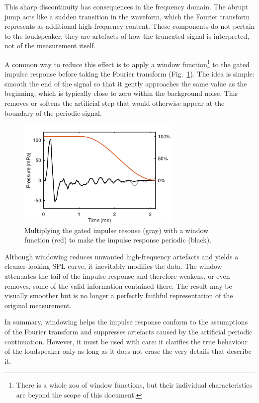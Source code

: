 \documentclass[12pt,a4paper]{article}
\providecommand{\figlabel}[1]{\label{fig:#1}}
\providecommand{\figr}[1]{Fig.~\ref{fig:#1}}
\begin{document}
This sharp discontinuity has consequences in the frequency domain. The abrupt jump acts like a sudden transition in the waveform, which the Fourier transform represents as additional high-frequency content. These components do not pertain to the loudspeaker; they are artefacts of how the truncated signal is interpreted, not of the measurement itself.

A common way to reduce this effect is to apply a window function\footnote{There is a whole zoo of window functions, but their individual characteristics are beyond the scope of this document.} to the gated impulse response before taking the Fourier transform (\figr{FIGURE4}). The idea is simple: smooth the end of the signal so that it gently approaches the same value as the beginning, which is typically close to zero within the background noise. This removes or softens the artificial step that would otherwise appear at the boundary of the periodic signal.

\begin{figure}[tbp]
  \begin{center}
    \includegraphics[width=0.7\textwidth]{FIGURE4}
    \caption{Multiplying the gated impulse resonse (gray) with a window function (red) to make the impulse response periodic (black).}
    \figlabel{FIGURE4}
  \end{center}
\end{figure}

Although windowing reduces unwanted high-frequency artefacts and yields a cleaner-looking SPL curve, it inevitably modifies the data. The window attenuates the tail of the impulse response and therefore weakens, or even removes, some of the valid information contained there. The result may be visually smoother but is no longer a perfectly faithful representation of the original measurement.

In summary, windowing helps the impulse response conform to the assumptions of the Fourier transform and suppresses artefacts caused by the artificial periodic continuation. However, it must be used with care: it clarifies the true behaviour of the loudspeaker only as long as it does not erase the very details that describe it.
\end{document}
